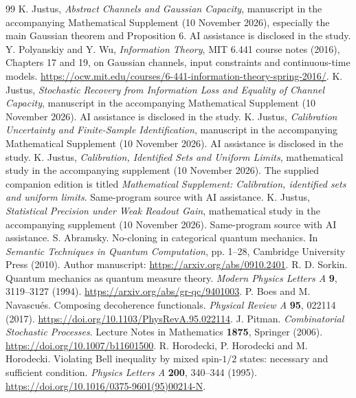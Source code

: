 \documentclass[11pt,a4paper]{article}
\begin{document}
\begin{thebibliography}{99}
 K. Justus, \emph{Abstract Channels and Gaussian Capacity}, manuscript in the accompanying Mathematical Supplement (10 November 2026), especially the main Gaussian theorem and Proposition 6. AI assistance is disclosed in the study.
 Y. Polyanskiy and Y. Wu, \emph{Information Theory}, MIT 6.441 course notes (2016), Chapters 17 and 19, on Gaussian channels, input constraints and continuous-time models. \url{https://ocw.mit.edu/courses/6-441-information-theory-spring-2016/}.
 K. Justus, \emph{Stochastic Recovery from Information Loss and Equality of Channel Capacity}, manuscript in the accompanying Mathematical Supplement (10 November 2026). AI assistance is disclosed in the study.
 K. Justus, \emph{Calibration Uncertainty and Finite-Sample Identification}, manuscript in the accompanying Mathematical Supplement (10 November 2026). AI assistance is disclosed in the study.
 K. Justus, \emph{Calibration, Identified Sets and Uniform Limits}, mathematical study in the accompanying supplement (10 November 2026). The supplied companion edition is titled \emph{Mathematical Supplement: Calibration, identified sets and uniform limits}. Same-program source with AI assistance.
 K. Justus, \emph{Statistical Precision under Weak Readout Gain}, mathematical study in the accompanying supplement (10 November 2026). Same-program source with AI assistance.
S. Abramsky. No-cloning in categorical quantum mechanics.
In \emph{Semantic Techniques in Quantum Computation}, pp. 1--28,
Cambridge University Press (2010).
Author manuscript: \url{https://arxiv.org/abs/0910.2401}.
R. D. Sorkin. Quantum mechanics as quantum measure theory.
\emph{Modern Physics Letters A} \textbf{9}, 3119--3127 (1994).
\url{https://arxiv.org/abs/gr-qc/9401003}.
P. Boes and M. Navascu\'es. Composing decoherence functionals.
\emph{Physical Review A} \textbf{95}, 022114 (2017).
\url{https://doi.org/10.1103/PhysRevA.95.022114}.
J. Pitman. \emph{Combinatorial Stochastic Processes}.
Lecture Notes in Mathematics \textbf{1875}, Springer (2006).
\url{https://doi.org/10.1007/b11601500}.
R. Horodecki, P. Horodecki and M. Horodecki.
Violating Bell inequality by mixed spin-$1/2$ states: necessary and sufficient condition.
\emph{Physics Letters A} \textbf{200}, 340--344 (1995).
\url{https://doi.org/10.1016/0375-9601(95)00214-N}.

\end{thebibliography}
\end{document}
